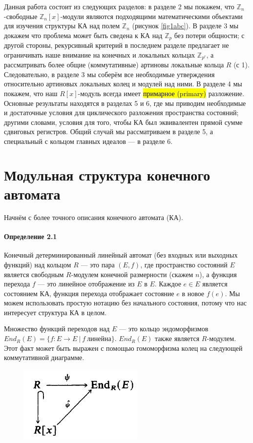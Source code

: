 \documentclass[a4paper,12pt]{article}
\begin{document}
Данная работа состоит из следующих разделов: в разделе 2 мы покажем, что $\mathbb{Z}_{n}$-свободные $\mathbb{Z}_{n}[x]$-модули являются подходящими математическими объектами для изучения структуры КА над полем $\mathbb{Z}_{n}$ (рисунок \ref{fig1abc}). В разделе 3 мы докажем что проблема может быть сведена к КА над $\mathbb{Z}_{p}$ без потери общности; с другой стороны, рекурсивный критерий в последнем разделе предлагает не ограничивать наше внимание на конечных и локальных кольцах $\mathbb{Z}_{p^r}$, а рассматривать более общие (коммутативные) артиновы локальные кольца $R$ (с 1). Следовательно, в разделе 3 мы соберём все необходимые утверждения относительно артиновых локальных колец и модулей над ними. В разделе 4 мы покажем, что наш $R[x]$-модуль всегда имеет \hl{примарное (primary)} разложение. Основные результаты находятся в разделах 5 и 6, где мы приводим необходимые и достаточные условия для циклического разложения пространства состояний; другими словами, условия для того, чтобы КА был эквивалентен прямой сумме сдвиговых регистров. Общий случай мы рассматриваем в разделе 5, а специальный с кольцом главных идеалов --- в разделе 6.


\section{Модульная структура конечного автомата}

Начнём с более точного описания конечного автомата (КА).

\paragraph{Определение 2.1}

Конечный детерминированный линейный автомат (без входных или выходных функций) над кольцом $R$ --- это пара $(E,f)$, где пространство состояний $E$ является свободным $R$-модулем конечной размерности (скажем $n$), а функция перехода $f$ --- это линейное отображение из $E$ в $E$. Каждое $e \in E$ является состоянием КА, функция перехода отображает состояние $e$ в новое $f(e)$. Мы можем использовать простую нотацию без начального состояния, потому что нас интересует структура КА в целом.

Множество функций переходов над $E$ --- это кольцо эндоморфизмов $End_R(E) = \{f : E \rightarrow E ~| ~f~ линейна\}$. $End_R(E)$ также является $R$-модулем. Этот факт может быть выражен с помощью гомоморфизма колец на следующей коммутативной диаграмме.

\begin{figure}[h]
	\centering
	\includegraphics[width=0.25\linewidth]{pictures/diag_1.png}
\end{figure}
\end{document}
